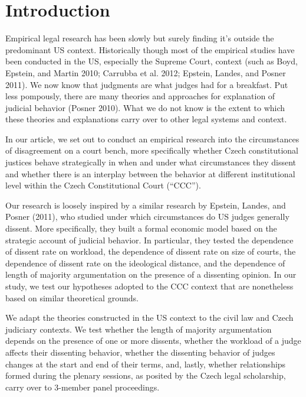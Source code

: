 \documentclass[
  11pt,
]{article}
\begin{document}
\vskip -8.5pt




\setlength{\parindent}{16pt}
\setlength{\parskip}{0pt}

\doublespacing
\vspace{30pt}

\hypertarget{introduction}{%
\section{Introduction}\label{introduction}}

Empirical legal research has been slowly but surely finding it's outside
the predominant US context. Historically though most of the empirical
studies have been conducted in the US, especially the Supreme Court,
context (such as Boyd, Epstein, and Martin 2010; Carrubba et al. 2012;
Epstein, Landes, and Posner 2011). We now know that judgments are what
judges had for a breakfast. Put less pompously, there are many theories
and approaches for explanation of judicial behavior (Posner 2010). What
we do not know is the extent to which these theories and explanations
carry over to other legal systems and context.

In our article, we set out to conduct an empirical research into the
circumstances of disagreement on a court bench, more specifically
whether Czech constitutional justices behave strategically in when and
under what circumstances they dissent and whether there is an interplay
between the behavior at different institutional level within the Czech
Constitutional Court (``CCC'').

Our research is loosely inspired by a similar research by Epstein,
Landes, and Posner (2011), who studied under which circumstances do US
judges generally dissent. More specifically, they built a formal
economic model based on the strategic account of judicial behavior. In
particular, they tested the dependence of dissent rate on workload, the
dependence of dissent rate on size of courts, the dependence of dissent
rate on the ideological distance, and the dependence of length of
majority argumentation on the presence of a dissenting opinion. In our
study, we test our hypotheses adopted to the CCC context that are
nonetheless based on similar theoretical grounds.

We adapt the theories constructed in the US context to the civil law and
Czech judiciary contexts. We test whether the length of majority
argumentation depends on the presence of one or more dissents, whether
the workload of a judge affects their dissenting behavior, whether the
dissenting behavior of judges changes at the start and end of their
terms, and, lastly, whether relationships formed during the plenary
sessions, as posited by the Czech legal scholarship, carry over to
3-member panel proceedings.
\end{document}
